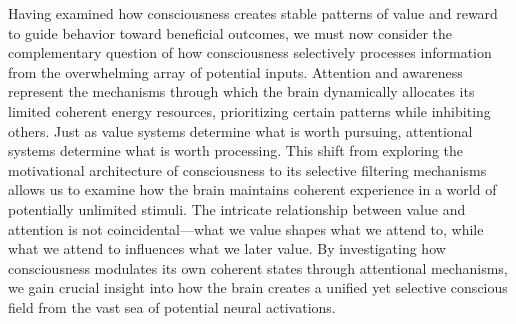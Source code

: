 Having examined how consciousness creates stable patterns of value and reward to guide behavior toward beneficial outcomes, we must now consider the complementary question of how consciousness selectively processes information from the overwhelming array of potential inputs. Attention and awareness represent the mechanisms through which the brain dynamically allocates its limited coherent energy resources, prioritizing certain patterns while inhibiting others. Just as value systems determine what is worth pursuing, attentional systems determine what is worth processing. This shift from exploring the motivational architecture of consciousness to its selective filtering mechanisms allows us to examine how the brain maintains coherent experience in a world of potentially unlimited stimuli. The intricate relationship between value and attention is not coincidental—what we value shapes what we attend to, while what we attend to influences what we later value. By investigating how consciousness modulates its own coherent states through attentional mechanisms, we gain crucial insight into how the brain creates a unified yet selective conscious field from the vast sea of potential neural activations.
